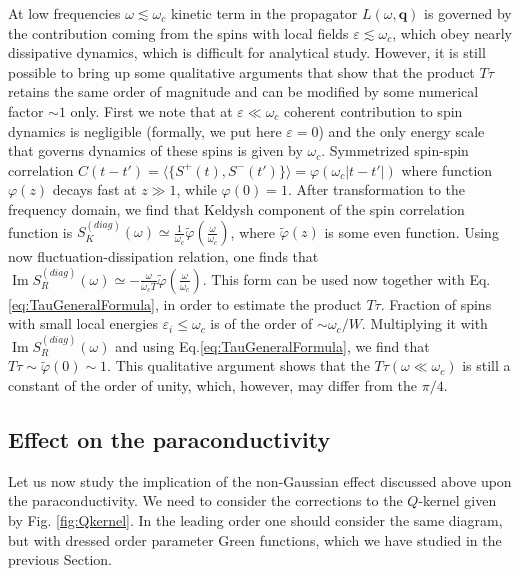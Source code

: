 \documentclass[twocolumn,english,prb]{revtex4-1}
\renewcommand{\Im}{\operatorname{Im}}
\begin{document}
At low frequencies $\omega \lesssim \omega_c$  kinetic term in the propagator $L(\omega,\boldsymbol{q})$ is governed by the contribution
coming from the spins with local fields $\varepsilon \lesssim \omega_c$, 
 which obey nearly dissipative dynamics,  which is difficult for analytical study.
However, it is still possible to bring up some qualitative arguments that show that the product $T\tau$ retains the same
order of magnitude and can be modified by some numerical factor $\sim 1$  only.  First we note that at $\varepsilon \ll \omega_c$
coherent contribution to spin dynamics is negligible (formally, we put here $\varepsilon =0$) and
 the only energy scale that governs  dynamics of these spins is  given by $\omega_c$.
Symmetrized spin-spin correlation  $C(t-t') = \langle \{S^+(t),S^-(t')\}\rangle = \varphi(\omega_c |t-t'|)$
where function $\varphi (z)$ decays fast at $z \gg 1$, while $\varphi(0)=1$.
 After transformation to the frequency domain, we find that  Keldysh component 
of the spin correlation function is 
$S_K^{(diag)}(\omega) \simeq \frac{1}{\omega_c} \tilde\varphi(\frac{\omega}{\omega_c})$, where
$\tilde\varphi(z)$ is some even function. Using now fluctuation-dissipation relation, one finds  that
$\Im S_{R}^{(diag)}(\omega)\simeq-\frac{\omega}{\omega_{c}T}\tilde\varphi(\frac{\omega}{\omega_{c}})$.
This form can be used now together with Eq.\eqref{eq:TauGeneralFormula}, in order to estimate the product $T\tau$.
Fraction of spins with small local energies $\varepsilon_i \leq \omega_c$ is of the order of $\sim \omega_c/W$.
Multiplying it with $\Im S_{R}^{(diag)}(\omega)$ and using Eq.\eqref{eq:TauGeneralFormula}, we find
that $T\tau \sim \tilde\varphi(0) \sim 1$.
 This qualitative argument shows that the $T \tau(\omega \ll \omega_c)$ is still a constant of the order of unity, which, however, may differ from the $\pi/4$.

\subsection{Effect on the paraconductivity}
Let us now study the  implication of the non-Gaussian effect discussed  above upon the paraconductivity. We need to consider 
the corrections to the $Q$-kernel given by Fig. \ref{fig:Qkernel}. In the leading order one should consider the same diagram, 
but with dressed order parameter Green functions, which we have studied in the previous Section. 
\end{document}
